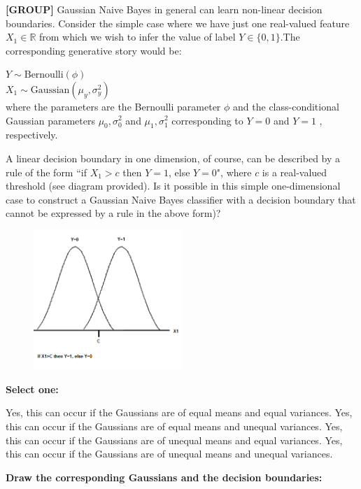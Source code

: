 \documentclass[11pt,addpoints,answers]{exam}
\newcommand{\group}{\textbf{[GROUP]} }
\begin{document}
\begin{questions}
    
    
    \question[4] \group Gaussian Naive Bayes in general can learn non-linear decision boundaries. Consider the simple case where we have just one real-valued feature $X_1\in\mathbb{R}$ from which we wish to infer the value of label $Y\in\{0,1\}$.The corresponding generative story would be:
    
    $Y \sim \text{Bernoulli}(\phi)$\\
    $X_1 \sim \text{Gaussian}(\mu_y, \sigma^2_y)$\\
    where the parameters are the Bernoulli parameter $\phi$  and the class-conditional Gaussian parameters $\mu_0, \sigma^2_0$ and $\mu_1, \sigma^2_1$   corresponding to $Y=0$ and $Y=1$ , respectively.

    A linear decision boundary in one dimension, of course, can be described by a rule of the form ``if $X_1>c$  then $Y=1$, else $Y=0$", where $c$ is a real-valued threshold (see diagram provided). Is it possible in this simple one-dimensional case to construct a Gaussian Naive Bayes classifier with a decision boundary that cannot be expressed by a rule in the above form)?

    \begin{figure}[H]
        \centering
        \includegraphics[width=0.5\textwidth]{Gaussians.png}
    \end{figure}
    
    \textbf{Select one:}
    \begin{checkboxes}
        \choice Yes, this can occur if the Gaussians are of equal means and equal variances.
        \choice Yes, this can occur if the Gaussians are of equal means and unequal variances.
        \choice Yes, this can occur if the Gaussians are of unequal means and equal variances. 
        \choice Yes, this can occur if the Gaussians are of unequal means and unequal variances.
    \end{checkboxes}
    
     
    \textbf{Draw the corresponding Gaussians and the decision boundaries: }
    
    
    
    \begin{your_solution}[title=Your answer,height=7cm,width=15cm]
    \end{your_solution}

    
    
    
\end{questions}
\end{document}
